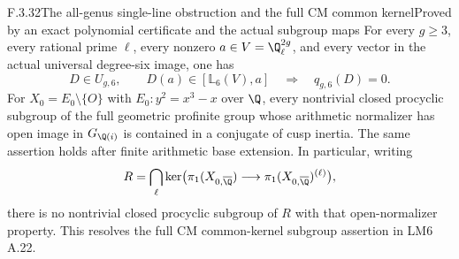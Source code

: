 \begin{result}{F.3.32}{The all-genus single-line obstruction and the full CM common kernel}{Proved by an exact polynomial certificate and the actual subgroup maps}
For every $g\geq3$, every rational prime $\ell$, every nonzero
$a\in V=\Q_\ell^{2g}$, and every vector in the actual universal
degree-six image, one has
\[
 D\in U_{g,6},\qquad D(a)\in[\mathbb L_6(V),a]
             \quad\Longrightarrow\quad q_{g,6}(D)=0.       \tag{UC.1}
\]
For $X_0=E_0\setminus\{O\}$ with $E_0:y^2=x^3-x$ over
$\Q$, every nontrivial closed procyclic subgroup of the full
geometric profinite group whose arithmetic normalizer has open
image in $G_{\Q(i)}$ is contained in a conjugate of cusp inertia.
The same assertion holds after finite arithmetic base extension.
In particular, writing
\[
 R=\bigcap_\ell\ker\bigl(\pi_1(X_{0,\overline\Q})
                    \longrightarrow
                    \pi_1(X_{0,\overline\Q})^{(\ell)}\bigr),
\]
there is no nontrivial closed procyclic subgroup of $R$ with
that open-normalizer property. This resolves the full CM
common-kernel subgroup assertion in LM6 A.22.
\end{result}
